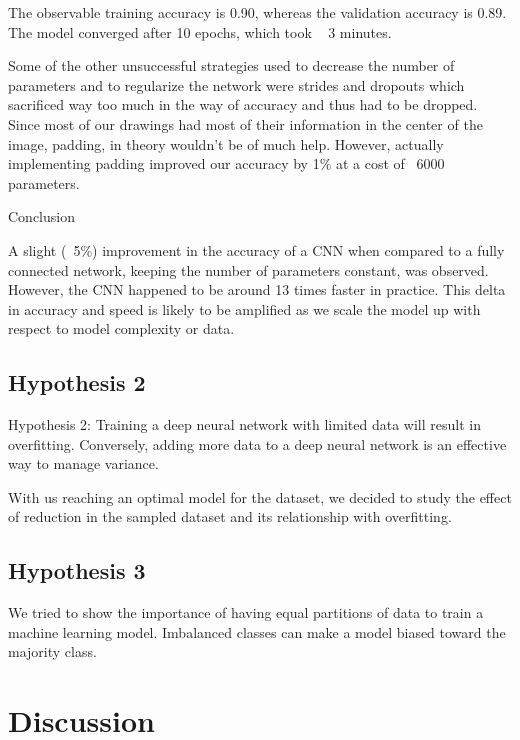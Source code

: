 \documentclass[12pt]{article}
\begin{document}
The observable training accuracy is 0.90, whereas the validation accuracy is 0.89. The model converged after 10 epochs, which took ~ 3 minutes.

Some of the other unsuccessful strategies used to decrease the number of parameters and to regularize the network were strides and dropouts which sacrificed way too much in the way of accuracy and thus had to be dropped. Since most of our drawings had most of their information in the center of the image, padding, in theory wouldn’t be of much help. However, actually implementing padding improved our accuracy by 1\% at a cost of ~6000 parameters.


Conclusion

A slight (~5\%) improvement in the accuracy of a CNN when compared to a fully connected network, keeping the number of parameters constant, was observed. However, the CNN happened to be around 13 times faster in practice. This delta in accuracy and speed is likely to be amplified as we scale the model up with respect to model complexity or data.

\subsection{Hypothesis 2}

Hypothesis 2: Training a deep neural network with limited data will result in overfitting. Conversely, adding more data to a deep neural network is an effective way to manage variance.

With us reaching an optimal model for the dataset, we decided to study the effect of reduction in the sampled dataset and its relationship with overfitting. 

\subsection{Hypothesis 3}


We tried to show the importance of having equal partitions of data to train a machine learning model. Imbalanced classes can make a model biased toward the majority class.  


\section{Discussion}






\end{document}
